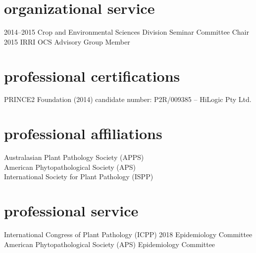       \section*{organizational service}
        \begin{entrylist}
          \entry
        	{2014--2015}
        	{Crop and Environmental Sciences Division Seminar Committee Chair}
        	{}
        	{}
	      \entry
	        {2015}
        	{IRRI OCS Advisory Group Member}
        	{}
        	{}
        \end{entrylist}
        \section*{professional certifications}
        PRINCE2 Foundation (2014) candidate number: P2R/009385 – HiLogic Pty Ltd.

        \section*{professional affiliations}
        Australasian Plant Pathology Society (APPS)\\
        American Phytopathological Society (APS)\\
        International Society for Plant Pathology (ISPP)\\

        \section*{professional service}
        International Congress of Plant Pathology (ICPP) 2018 Epidemiology Committee\\
        American Phytopathological Society (APS) Epidemiology Committee\\
